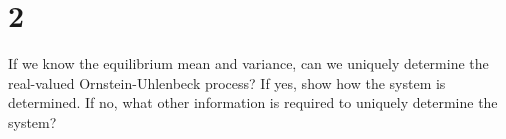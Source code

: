 \section{2}

If we know the equilibrium mean and variance, can we uniquely determine the real-valued Ornstein-Uhlenbeck process? If yes, show how the system is determined. If no, what other information is required to uniquely determine the system?

